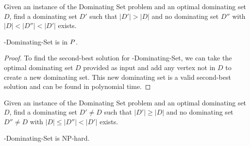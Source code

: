 \begin{definition}
Given an instance of the Dominating Set problem and an optimal dominating set $D$, find a dominating set $D'$ such that $|D'| > |D|$ and no dominating set $D''$ with $|D| < |D''| < |D'|$ exists.
\end{definition}

\begin{theorem}
\exob{}-Dominating-Set is in ${P}{}$.
\end{theorem}
\begin{proof}
To find the second-best solution for \exob{}-Dominating-Set, we can take the optimal dominating set $D$ provided as input and add any vertex not in $D$ to create a new dominating set. This new dominating set is a valid second-best solution and can be found in polynomial time.
\end{proof}

\begin{definition}
Given an instance of the Dominating Set problem and an optimal dominating set $D$, find a dominating set $D' \neq D$ such that $|D'| \geq |D|$ and no dominating set $D'' \neq D$ with $|D| \leq |D''| < |D'|$ exists.
\end{definition}
\begin{theorem}
\inob{}-Dominating-Set is NP-hard.
\end{theorem}

